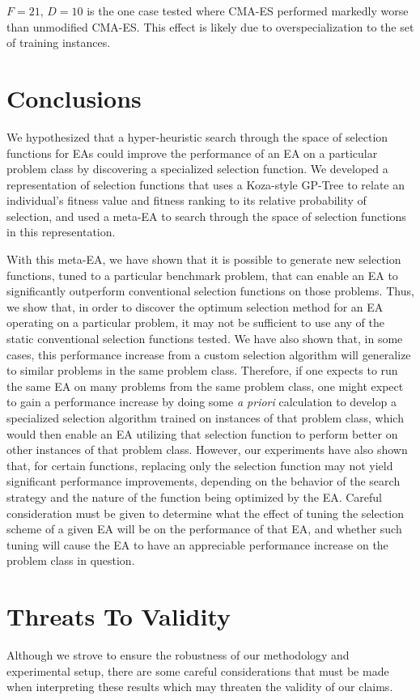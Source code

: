 \documentclass[sigconf]{acmart}
\begin{document}
$F=21$, $D=10$ is the one case tested where CMA-ES performed markedly worse than unmodified CMA-ES. This effect is likely due to overspecialization to the set of training instances.

\section{Conclusions}
\label{Conclusion}
We hypothesized that a hyper-heuristic search through the space of selection functions for EAs could improve the performance of an EA on a particular problem class by discovering a specialized selection function. We developed a representation of selection functions that uses a Koza-style GP-Tree to relate an individual's fitness value and fitness ranking to its relative probability of selection, and used a meta-EA to search through the space of selection functions in this representation. 

With this meta-EA, we have shown that it is possible to generate new selection functions, tuned to a particular benchmark problem, that can enable an EA to significantly outperform conventional selection functions on those problems. Thus, we show that, in order to discover the optimum selection method for an EA operating on a particular problem, it may not be sufficient to use any of the static conventional selection functions tested. We have also shown that, in some cases, this performance increase from a custom selection algorithm will generalize to similar problems in the same problem class. Therefore, if one expects to run the same EA on many problems from the same problem class, one might expect to gain a performance increase by doing some \textit{a priori} calculation to develop a specialized selection algorithm trained on instances of that problem class, which would then enable an EA utilizing that selection function to perform better on other instances of that problem class. However, our experiments have also shown that, for certain functions, replacing only the selection function may not yield significant performance improvements, depending on the behavior of the search strategy and the nature of the function being optimized by the EA. Careful consideration must be given to determine what the effect of tuning the selection scheme of a given EA will be on the performance of that EA, and whether such tuning will cause the EA to have an appreciable performance increase on the problem class in question. 

\section{Threats To Validity}
\label{Threats to Validity}
Although we strove to ensure the robustness of our methodology and experimental setup, there are some careful considerations that must be made when interpreting these results which may threaten the validity of our claims.
\end{document}
